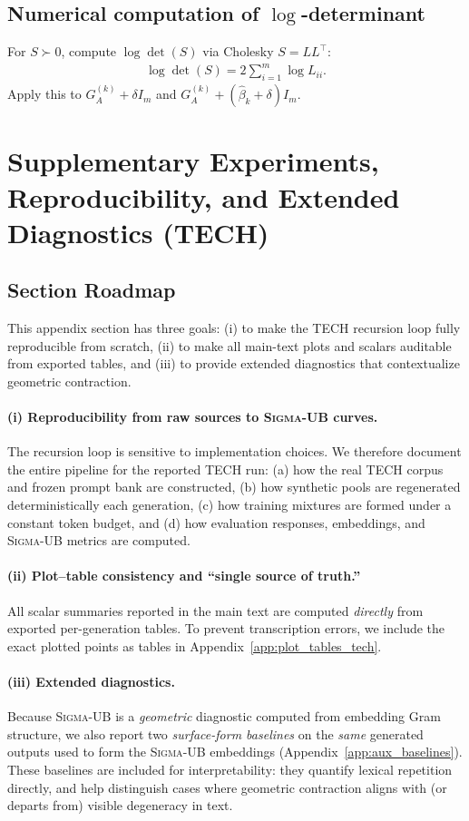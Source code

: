 \documentclass{article}
\theoremstyle{plain}
\theoremstyle{definition}
\theoremstyle{remark}
\newcommand{\sgma}{\textsc{Sigma}\xspace}
\begin{document}
\subsection{Numerical computation of \texorpdfstring{$\log$-determinant}{log-determinant}}
For $S\succ 0$, compute $\log\det(S)$ via Cholesky $S=LL^\top$:
\begin{align}
\log\det(S) = 2\sum_{i=1}^m \log L_{ii}.
\end{align}
Apply this to $G_A^{(k)}+\delta I_m$ and $G_A^{(k)}+(\widehat{\beta}_k+\delta)I_m$.


\section{Supplementary Experiments, Reproducibility, and Extended Diagnostics (TECH)}
\label{app:exp_appendix}

\subsection{Section Roadmap}
This appendix section has three goals: (i) to make the TECH recursion loop fully reproducible from scratch, (ii) to make all main-text plots and scalars auditable from exported tables, and (iii) to provide extended diagnostics that contextualize geometric contraction.

\paragraph{(i) Reproducibility from raw sources to \sgma-UB curves.}
The recursion loop is sensitive to implementation choices. We therefore document the entire pipeline for the reported TECH run: (a) how the real TECH corpus and frozen prompt bank are constructed, (b) how synthetic pools are regenerated deterministically each generation, (c) how training mixtures are formed under a constant token budget, and (d) how evaluation responses, embeddings, and \sgma-UB metrics are computed. 

\paragraph{(ii) Plot--table consistency and “single source of truth.”}
All scalar summaries reported in the main text are computed \emph{directly} from exported per-generation tables. To prevent transcription errors, we include the exact plotted points as tables in Appendix~\ref{app:plot_tables_tech}.


\paragraph{(iii) Extended diagnostics.}
Because \sgma-UB is a \emph{geometric} diagnostic computed from embedding Gram structure, we also report two
\emph{surface-form baselines} on the \emph{same} generated outputs used to form the \sgma-UB embeddings
(Appendix~\ref{app:aux_baselines}). These baselines are included for interpretability: they quantify
lexical repetition directly, and help distinguish cases where geometric contraction aligns with (or departs from)
visible degeneracy in text.
\end{document}
